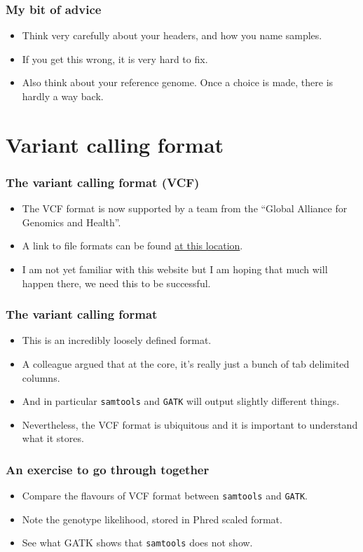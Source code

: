 \documentclass{beamer}
\begin{document}
\begin{frame}
  \frametitle{My bit of advice}
  \begin{itemize}
    \item Think very carefully about your headers, and how you name samples.
    \item If you get this wrong, it is very hard to fix.
    \item Also think about your reference genome. Once a choice is made, there is hardly a way back.
  \end{itemize}
\end{frame}


\section{Variant calling format}

\begin{frame}
  \frametitle{The variant calling format (VCF)}
  \begin{itemize}
  \item The VCF format is now supported by a team from the ``Global Alliance for Genomics and Health''.
  \item A link to file formats can be found \href{http://ga4gh.org/\#/fileformats-team}{at this location}.
  \item I am not yet familiar with this website but I am hoping that much will happen there, we need this to be successful.
  \end{itemize}
\end{frame}


\begin{frame}
  \frametitle{The variant calling format}
  \begin{itemize}
  \item This is an incredibly loosely defined format.
  \item A colleague argued that at the core, it's really just a bunch of tab delimited columns.
  \item And in particular \texttt{samtools} and \texttt{GATK} will output slightly different things.
  \item Nevertheless, the VCF format is ubiquitous and it is important to understand what it stores.
  \end{itemize}
\end{frame}



\begin{frame}
  \frametitle{An exercise to go through together}
  \begin{itemize}
  \item Compare the flavours of VCF format between \texttt{samtools} and \texttt{GATK}.
  \item Note the genotype likelihood, stored in Phred scaled format.
  \item See what GATK shows that \texttt{samtools} does not show.
  \end{itemize}
\end{frame}
    
\end{document}
